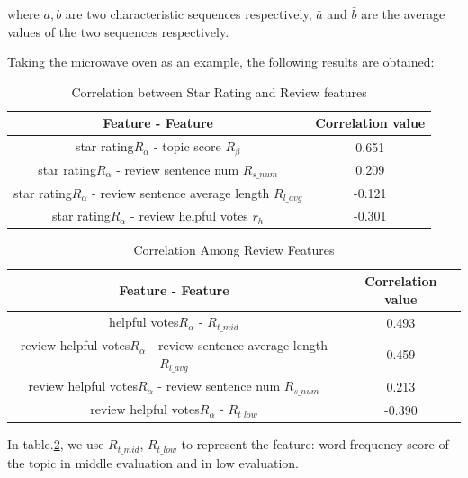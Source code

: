 \documentclass{mcmthesis}
\begin{document}
where $a,b$ are two characteristic sequences respectively, ${\bar{a}}$ and ${\bar{b}}$ are the average values of the two sequences respectively.

Taking the microwave oven as an example, the following results are obtained:
\begin{table}[H]
	\center
	\caption{Correlation between Star Rating and Review features}
	\label{type}
	\begin{tabular}{c|c}
		\hline
		\textbf{Feature - Feature} & \textbf{Correlation value} \\ \hline
		star rating$R_{\alpha}$ -  topic score $R_{\beta}$             & 0.651                    \\ 
		star rating$R_{\alpha}$ -  review sentence num  $R_{s\_{num}}$              & 0.209                     \\ 
		star rating$R_{\alpha}$ -  review sentence average length  $R_{l\_{avg}}$              & -0.121                     \\ 
		star rating$R_{\alpha}$ -  review helpful votes  $r_{h}$                & -0.301 	\\ \hline
	\end{tabular}
\end{table}

\begin{table}[H]
	\center
	\caption{Correlation Among Review Features}
	\label{type}
	\begin{tabular}{c|c}
		\hline
		\textbf{Feature - Feature} & \textbf{Correlation value} \\ \hline
		helpful votes$R_{\alpha}$ -   $R_{t\_{mid}}$               & 0.493                     \\ 
		review helpful votes$R_{\alpha}$ -  review sentence average length  $R_{l\_{avg}}$             & 0.459                    \\
		review helpful votes$R_{\alpha}$ -  review sentence num  $R_{s\_{num}}$              & 0.213                     \\ 
		review helpful votes$R_{\alpha}$ -  $R_{t\_{low}}$                & -0.390 	\\ \hline
	\end{tabular}
	\label{table2}
\end{table}
 In table.\ref{table2}, we use $R_{t\_{mid}}$, $R_{t\_{low}}$ to represent the feature: word frequency score of the topic in middle evaluation and in low  evaluation.
 
\end{document}
